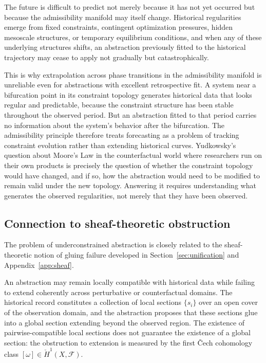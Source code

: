 \documentclass[12pt, a4paper]{article}
\theoremstyle{plain}
\theoremstyle{definition}
\theoremstyle{remark}
\begin{document}
The future is difficult to predict not merely because it has not yet occurred but
because the admissibility manifold may itself change.
Historical regularities emerge from fixed constraints, contingent optimization
pressures, hidden mesoscale structures, or temporary equilibrium conditions, and when
any of these underlying structures shifts, an abstraction previously fitted to the
historical trajectory may cease to apply not gradually but catastrophically.

This is why extrapolation across phase transitions in the admissibility manifold is
unreliable even for abstractions with excellent retrospective fit.
A system near a bifurcation point in its constraint topology generates historical data
that looks regular and predictable, because the constraint structure has been stable
throughout the observed period.
But an abstraction fitted to that period carries no information about the system's
behavior after the bifurcation.
The admissibility principle therefore treats forecasting as a problem of tracking
constraint evolution rather than extending historical curves.
Yudkowsky's question about Moore's Law in the counterfactual world where researchers
run on their own products is precisely the question of whether the constraint topology
would have changed, and if so, how the abstraction would need to be modified to remain
valid under the new topology.
Answering it requires understanding what generates the observed regularities, not
merely that they have been observed.

\subsection{Connection to sheaf-theoretic obstruction}

The problem of underconstrained abstraction is closely related to the sheaf-theoretic
notion of gluing failure developed in Section~\ref{sec:unification} and
Appendix~\ref{app:sheaf}.

An abstraction may remain locally compatible with historical data while failing to
extend coherently across perturbative or counterfactual domains.
The historical record constitutes a collection of local sections $\{s_i\}$ over an
open cover of the observation domain, and the abstraction proposes that these sections
glue into a global section extending beyond the observed region.
The existence of pairwise-compatible local sections does not guarantee the existence
of a global section: the obstruction to extension is measured by the first
\v{C}ech cohomology class $[\omega] \in \check{H}^1(X, \mathcal{F})$.
\end{document}
